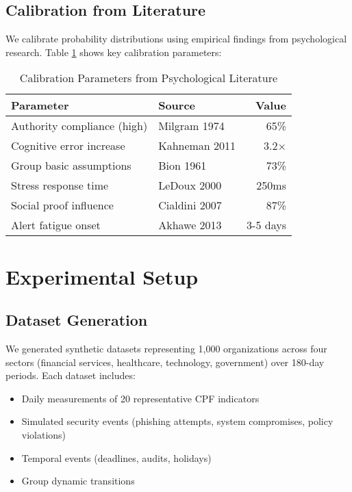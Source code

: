 \documentclass[10pt,twocolumn]{IEEEtran}
\begin{document}
\subsection{Calibration from Literature}

We calibrate probability distributions using empirical findings from psychological research. Table \ref{tab:calibration} shows key calibration parameters:

\begin{table}[h]
\caption{Calibration Parameters from Psychological Literature}
\label{tab:calibration}
\centering
\begin{tabular}{@{}llr@{}}
\toprule
Parameter & Source & Value \\
\midrule
Authority compliance (high) & Milgram 1974 & 65\% \\
Cognitive error increase & Kahneman 2011 & 3.2× \\
Group basic assumptions & Bion 1961 & 73\% \\
Stress response time & LeDoux 2000 & 250ms \\
Social proof influence & Cialdini 2007 & 87\% \\
Alert fatigue onset & Akhawe 2013 & 3-5 days \\
\bottomrule
\end{tabular}
\end{table}

\section{Experimental Setup}

\subsection{Dataset Generation}

We generated synthetic datasets representing 1,000 organizations across four sectors (financial services, healthcare, technology, government) over 180-day periods. Each dataset includes:

\begin{itemize}
\item Daily measurements of 20 representative CPF indicators
\item Simulated security events (phishing attempts, system compromises, policy violations)
\item Temporal events (deadlines, audits, holidays)
\item Group dynamic transitions
\end{itemize}
\end{document}
